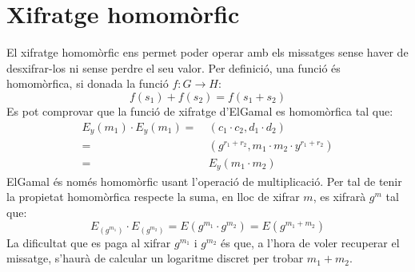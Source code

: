 \documentclass{article}
\begin{document}
\section{Xifratge homomòrfic}\label{sec:homomorfism}
El xifratge homomòrfic ens permet poder operar amb els missatges sense haver de desxifrar-los ni sense perdre el seu valor.
Per definició, una funció és homomòrfica, si donada la funció $f: G \rightarrow H$:
\[f(s_1) + f(s_2) = f(s_1+s_2)\]
Es pot comprovar que la funció de xifratge d'ElGamal es homomòrfica tal que:
\begin{equation*}
\begin{aligned}
	E_y(m_1) \cdot E_y(m_1) =& \ (c_1 \cdot c_2, d_1 \cdot d_2)\\
	=& \ (g^{r_1 + r_2}, m_1 \cdot m_2 \cdot y^{r_1 + r_2} ) \\
	=& \ E_y(m_1 \cdot m_2)
\end{aligned}
\end{equation*}
ElGamal és només homomòrfic usant l'operació de multiplicació. Per tal de tenir la propietat homomòrfica respecte la suma, en lloc de xifrar $m$, es xifrarà $g^m$ tal que:
\[E_(g^{m_1})  \cdot E_(g^{m_2}) = E(g^{m_1} \cdot g^{m_2}) = E(g^{m_1 + m_2})\] 
La dificultat que es paga al xifrar $g^{m_1}$ i $g^{m_2}$ és que, a l'hora de voler recuperar el missatge, s'haurà de calcular un logaritme discret per trobar $m_1 + m _2$.
\end{document}
